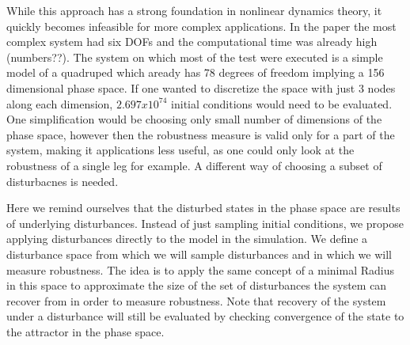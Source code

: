 




    While this approach has a strong foundation in nonlinear dynamics theory, it quickly becomes infeasible for more complex applications. In the paper the most complex system had six DOFs and the computational time was already high (numbers??). 
    The system on which most of the test were executed is a simple model of a quadruped which aready has 78 degrees of freedom implying a 156 dimensional phase space. If one wanted to discretize the space with just 3 nodes along each dimension, $2.697x10^74$ initial conditions would need to be evaluated. One simplification would be choosing only small number of dimensions of the phase space, however then the robustness measure is valid only for a part of the system, making it applications less useful, as one could only look at the robustness of a single leg for example.
    A different way of choosing a subset of disturbacnes is needed. 
    
    Here we remind ourselves that the disturbed states in the phase space are results of underlying disturbances. Instead of just sampling initial conditions, we propose applying disturbances directly to the model in the simulation. We define a disturbance space from which we will sample disturbances and in which we will measure robustness. The idea is to apply the same concept of a minimal Radius in this space to approximate the size of the set of disturbances the system can recover from in order to measure robustness. Note that recovery of the system under a disturbance will still be evaluated by checking convergence of the state to the attractor in the phase space. 

